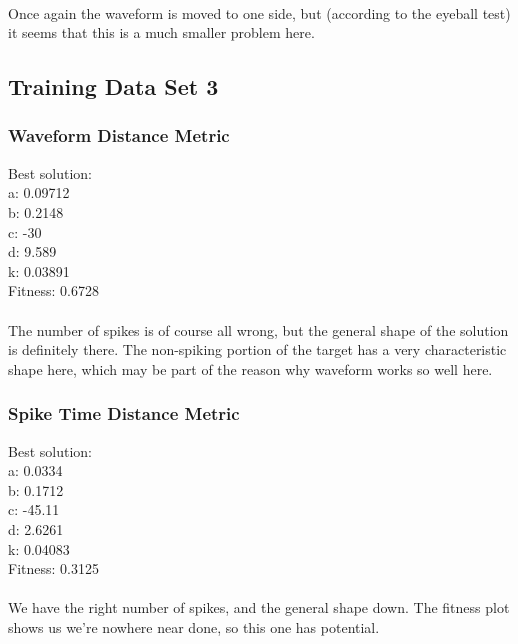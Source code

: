 \documentclass[a4paper,12pt]{article}
\begin{document}
\paragraph{}Once again the waveform is moved to one side, but (according to the eyeball test) it seems that this is a much smaller problem here.

\subsection{Training Data Set 3}
\subsubsection{Waveform Distance Metric}
Best solution: \\
a: 0.09712 \\
b: 0.2148 \\
c: -30 \\
d: 9.589 \\
k: 0.03891 \\
Fitness: 0.6728
\paragraph{}The number of spikes is of course all wrong, but the general shape of the solution is definitely there. The non-spiking portion of the target has a very characteristic shape here, which may be part of the reason why waveform works so well here.

\subsubsection{Spike Time Distance Metric}
Best solution: \\
a: 0.0334 \\
b: 0.1712 \\
c: -45.11 \\
d: 2.6261 \\
k: 0.04083 \\
Fitness: 0.3125
\paragraph{}We have the right number of spikes, and the general shape down. The fitness plot shows us we're nowhere near done, so this one has potential.
\end{document}
